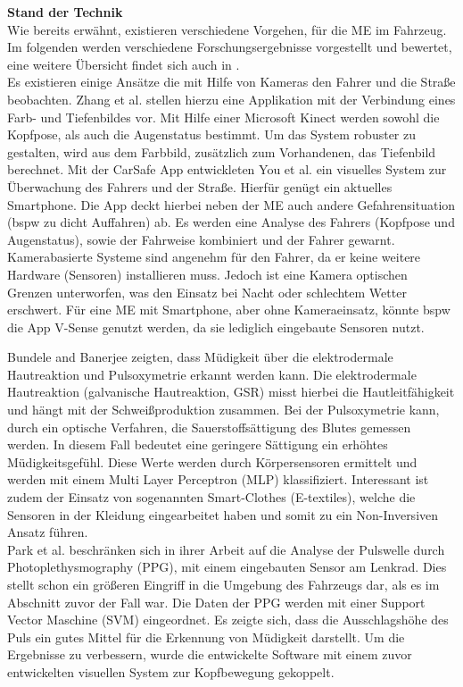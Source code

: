 {\textbf{Stand der Technik} \\
Wie bereits erwähnt, existieren verschiedene Vorgehen, für die \acl{ME} im Fahrzeug. Im folgenden werden verschiedene Forschungsergebnisse vorgestellt und bewertet, eine weitere Übersicht findet sich auch in \cite{Sahayadhas_121216937}.\\

Es existieren einige Ansätze die mit Hilfe von Kameras den Fahrer und die Straße beobachten. Zhang et al. \cite{Zhang:2015:RSD:2753829.2629482} stellen hierzu eine Applikation mit der Verbindung eines Farb- und Tiefenbildes vor. Mit Hilfe einer Microsoft Kinect werden sowohl die Kopfpose, als auch die Augenstatus bestimmt. Um das System robuster zu gestalten, wird aus dem Farbbild,  zusätzlich zum Vorhandenen, das Tiefenbild berechnet. Mit der CarSafe App entwickleten You et al. \cite{You:2013:CAA:2462456.2465428} ein visuelles System zur Überwachung des Fahrers und der Straße. Hierfür genügt ein aktuelles Smartphone. Die App deckt hierbei neben der \acl{ME} auch andere Gefahrensituation (\acl{bspw} zu dicht Auffahren) ab. Es werden eine Analyse des Fahrers (Kopfpose und Augenstatus), sowie der Fahrweise kombiniert und der Fahrer gewarnt. Kamerabasierte Systeme sind angenehm für den Fahrer, da er keine weitere Hardware (Sensoren) installieren muss. Jedoch ist eine Kamera optischen Grenzen unterworfen, was den Einsatz bei Nacht oder schlechtem Wetter erschwert. Für eine \acl{ME} mit Smartphone, aber ohne Kameraeinsatz, könnte \acl{bspw} die App V-Sense \cite{Chen:2015:ISV:2742647.2742659} genutzt werden, da sie lediglich  eingebaute Sensoren nutzt.

Bundele and Banerjee \citep{Bundele:2009:DFV:1806338.1806478} zeigten, dass Müdigkeit über die elektrodermale Hautreaktion und Pulsoxymetrie erkannt werden kann. Die elektrodermale Hautreaktion (galvanische Hautreaktion, GSR) misst hierbei die Hautleitfähigkeit und hängt mit der Schweißproduktion zusammen. Bei der Pulsoxymetrie kann, durch ein optische Verfahren, die Sauerstoffsättigung des Blutes gemessen werden. In diesem Fall bedeutet eine geringere Sättigung ein erhöhtes Müdigkeitsgefühl. Diese Werte werden durch Körpersensoren ermittelt und werden mit einem Multi Layer Perceptron (MLP) klassifiziert. Interessant ist zudem der Einsatz von sogenannten Smart-Clothes (E-textiles), welche die Sensoren in der Kleidung eingearbeitet haben und somit zu ein Non-Inversiven Ansatz führen.\\

Park et al. \cite{Park:2009:DDD:1667780.1667798} beschränken sich in ihrer Arbeit auf die Analyse der Pulswelle durch Photoplethysmography (PPG), mit einem eingebauten Sensor am Lenkrad. Dies stellt schon ein größeren Eingriff in die Umgebung des Fahrzeugs dar, als es im Abschnitt zuvor der Fall war. Die Daten der PPG werden mit einer Support Vector Maschine (SVM) eingeordnet. Es zeigte sich, dass die Ausschlagshöhe des Puls ein gutes Mittel für die Erkennung von Müdigkeit darstellt. Um die Ergebnisse zu verbessern, wurde die entwickelte Software mit einem zuvor entwickelten visuellen System zur Kopfbewegung gekoppelt. \\

}
